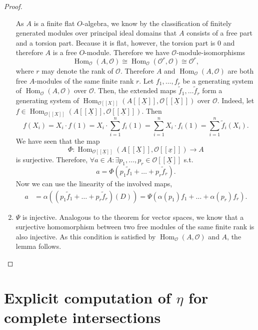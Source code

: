 \documentclass{article}
\theoremstyle{plain}%
\theoremstyle{definition}
\theoremstyle{remark}
\renewcommand{\hom}{\operatorname{Hom}}
\begin{document}
\begin{proof}
\begin{enumerate}
        As \(A\) is a finite flat \(O\)-algebra, we know by the classification of finitely generated modules
        over principal ideal domains that \(A\) consists of a free part and a torsion part. Because it is flat,
        however, the torsion part is 0 and therefore \(A\) is a free \(O\)-module.
        Therefore we have \(\mathcal{O}\)-module-isomorphisms
        \[
            \hom_\mathcal{O}(A, \mathcal{O}) \cong \hom_\mathcal{O}(\mathcal{O}^r, \mathcal{O})
            \cong \mathcal{O}^r,
        \]
        where \(r\) may denote the rank of \(\mathcal{O}\). 
        Therefore \(A\) and \(\hom_\mathcal{O}(A, \mathcal{O})\) are both free \(A\)-modules of the 
        same finite rank \(r\).
        Let \(f_1, \dots, f_r\) be a generating system of \(\hom_\mathcal{O}(A, \mathcal{O})\) over
        \(\mathcal{O}\). Then, the extended maps \(\tilde f_1, \dots \tilde f_r\) form a generating
        system of \(\hom_{\mathcal{O}[[X]]}(A[[\underline{X}]], \mathcal{O}[[\underline{X}]])\) over
        \(\mathcal{O}\). Indeed, let 
        \(f \in \hom_{\mathcal{O}[[X]]}(A[[\underline{X}]], \mathcal{O}[[\underline{X}]])\).
        Then
        \[ 
            f(X_i) = X_i \cdot f(1) = X_i \cdot \sum_{i=1}^nf_i(1) = \sum_{i=1}^n X_i \cdot f_i(1) 
            = \sum_{i=1}^n \tilde f_i(X_i).
        \]
        We have seen that the map 
        \[
            \Phi\colon \hom_{\mathcal{O}[[\underline{X}]]}(A[[\underline{X}]], \mathcal{O}[[\underline{x}]]) \to A
        \] 
        is surjective.
        Therefore, \(\forall a \in A\colon \exists p_1, \dots, p_r \in \mathcal{O}[[\underline{X}]]\) s.t.
        \[
            a = \Phi(p_1 \tilde f_1 + \dots + p_r \tilde f_r).
        \]
        Now we can use the linearity of the involved maps,
        \begin{align*} 
                a &= \alpha((p_1 \tilde f_1 + \dots + p_r \tilde f_r)(D))
                = \Psi(\alpha(p_1) f_1 + \dots + \alpha(p_r) f_r).
        \end{align*}
        \item \(\Psi\) is injective.
        Analogous to the theorem for vector spaces, we know that a surjective homomorphism between two free modules 
        of the same finite rank is also injective.
        As this condition is satisfied by \(\hom_\mathcal{O}(A, \mathcal{O})\) and \(A\), 
        the lemma follows.
    \end{enumerate}
\end{proof}

\section{Explicit computation of \texorpdfstring{\(\eta\)}{η} for complete intersections}
\end{document}
